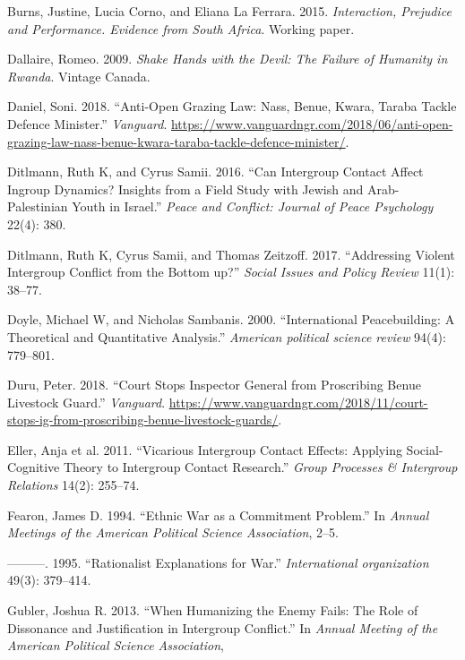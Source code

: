 \documentclass[11pt]{article}
\begin{document}
\hypertarget{ref-burns2015interaction}{}
Burns, Justine, Lucia Corno, and Eliana La Ferrara. 2015.
\emph{Interaction, Prejudice and Performance. Evidence from South
Africa}. Working paper.

\hypertarget{ref-dallaire2009shake}{}
Dallaire, Romeo. 2009. \emph{Shake Hands with the Devil: The Failure of
Humanity in Rwanda}. Vintage Canada.

\hypertarget{ref-daniel2018anti}{}
Daniel, Soni. 2018. ``Anti-Open Grazing Law: Nass, Benue, Kwara, Taraba
Tackle Defence Minister.'' \emph{Vanguard}.
\url{https://www.vanguardngr.com/2018/06/anti-open-grazing-law-nass-benue-kwara-taraba-tackle-defence-minister/}.

\hypertarget{ref-ditlmann2016can}{}
Ditlmann, Ruth K, and Cyrus Samii. 2016. ``Can Intergroup Contact Affect
Ingroup Dynamics? Insights from a Field Study with Jewish and
Arab-Palestinian Youth in Israel.'' \emph{Peace and Conflict: Journal of
Peace Psychology} 22(4): 380.

\hypertarget{ref-ditlmann2017addressing}{}
Ditlmann, Ruth K, Cyrus Samii, and Thomas Zeitzoff. 2017. ``Addressing
Violent Intergroup Conflict from the Bottom up?'' \emph{Social Issues
and Policy Review} 11(1): 38--77.

\hypertarget{ref-doyle2000international}{}
Doyle, Michael W, and Nicholas Sambanis. 2000. ``International
Peacebuilding: A Theoretical and Quantitative Analysis.'' \emph{American
political science review} 94(4): 779--801.

\hypertarget{ref-duru2018court}{}
Duru, Peter. 2018. ``Court Stops Inspector General from Proscribing
Benue Livestock Guard.'' \emph{Vanguard}.
\url{https://www.vanguardngr.com/2018/11/court-stops-ig-from-proscribing-benue-livestock-guards/}.

\hypertarget{ref-mazziotta2011vicarious}{}
Eller, Anja et al. 2011. ``Vicarious Intergroup Contact Effects:
Applying Social-Cognitive Theory to Intergroup Contact Research.''
\emph{Group Processes \& Intergroup Relations} 14(2): 255--74.

\hypertarget{ref-fearon1994ethnic}{}
Fearon, James D. 1994. ``Ethnic War as a Commitment Problem.'' In
\emph{Annual Meetings of the American Political Science Association},
2--5.

\hypertarget{ref-fearon1995rationalist}{}
---------. 1995. ``Rationalist Explanations for War.''
\emph{International organization} 49(3): 379--414.

\hypertarget{ref-gubler2013humanizing}{}
Gubler, Joshua R. 2013. ``When Humanizing the Enemy Fails: The Role of
Dissonance and Justification in Intergroup Conflict.'' In \emph{Annual
Meeting of the American Political Science Association},
\end{document}
